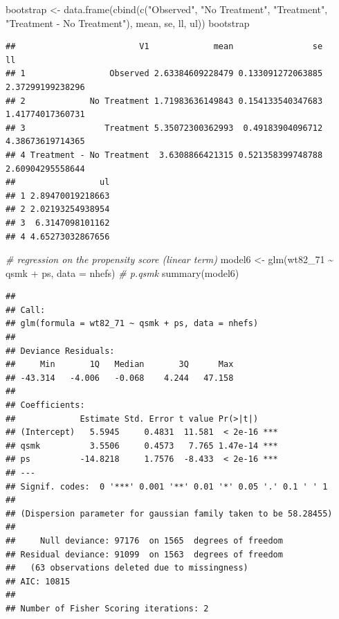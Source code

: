 \documentclass[
  10pt,
]{book}
\newenvironment{Shaded}{\begin{snugshade}}{\end{snugshade}}
\newcommand{\AttributeTok}[1]{\textcolor[rgb]{0.77,0.63,0.00}{#1}}
\newcommand{\CommentTok}[1]{\textcolor[rgb]{0.56,0.35,0.01}{\textit{#1}}}
\newcommand{\FunctionTok}[1]{\textcolor[rgb]{0.00,0.00,0.00}{#1}}
\newcommand{\NormalTok}[1]{#1}
\newcommand{\OtherTok}[1]{\textcolor[rgb]{0.56,0.35,0.01}{#1}}
\newcommand{\SpecialCharTok}[1]{\textcolor[rgb]{0.00,0.00,0.00}{#1}}
\newcommand{\StringTok}[1]{\textcolor[rgb]{0.31,0.60,0.02}{#1}}
\begin{document}
\begin{Shaded}
\begin{Highlighting}[]
\NormalTok{bootstrap }\OtherTok{\textless{}{-}} \FunctionTok{data.frame}\NormalTok{(}\FunctionTok{cbind}\NormalTok{(}\FunctionTok{c}\NormalTok{(}\StringTok{"Observed"}\NormalTok{, }\StringTok{"No Treatment"}\NormalTok{, }\StringTok{"Treatment"}\NormalTok{, }
                                \StringTok{"Treatment {-} No Treatment"}\NormalTok{), mean, se, ll, ul))}
\NormalTok{bootstrap}
\end{Highlighting}
\end{Shaded}

\begin{verbatim}
##                         V1             mean                se               ll
## 1                 Observed 2.63384609228479 0.133091272063885 2.37299199238296
## 2             No Treatment 1.71983636149843 0.154133540347683 1.41774017360731
## 3                Treatment 5.35072300362993  0.49183904096712 4.38673619714365
## 4 Treatment - No Treatment  3.6308866421315 0.521358399748788 2.60904295558644
##                 ul
## 1 2.89470019218663
## 2 2.02193254938954
## 3  6.3147098101162
## 4 4.65273032867656
\end{verbatim}

\begin{Shaded}
\begin{Highlighting}[]
\CommentTok{\# regression on the propensity score (linear term)}
\NormalTok{model6 }\OtherTok{\textless{}{-}} \FunctionTok{glm}\NormalTok{(wt82\_71 }\SpecialCharTok{\textasciitilde{}}\NormalTok{ qsmk }\SpecialCharTok{+}\NormalTok{ ps, }\AttributeTok{data =}\NormalTok{ nhefs) }\CommentTok{\# p.qsmk}
\FunctionTok{summary}\NormalTok{(model6)}
\end{Highlighting}
\end{Shaded}

\begin{verbatim}
## 
## Call:
## glm(formula = wt82_71 ~ qsmk + ps, data = nhefs)
## 
## Deviance Residuals: 
##     Min       1Q   Median       3Q      Max  
## -43.314   -4.006   -0.068    4.244   47.158  
## 
## Coefficients:
##             Estimate Std. Error t value Pr(>|t|)    
## (Intercept)   5.5945     0.4831  11.581  < 2e-16 ***
## qsmk          3.5506     0.4573   7.765 1.47e-14 ***
## ps          -14.8218     1.7576  -8.433  < 2e-16 ***
## ---
## Signif. codes:  0 '***' 0.001 '**' 0.01 '*' 0.05 '.' 0.1 ' ' 1
## 
## (Dispersion parameter for gaussian family taken to be 58.28455)
## 
##     Null deviance: 97176  on 1565  degrees of freedom
## Residual deviance: 91099  on 1563  degrees of freedom
##   (63 observations deleted due to missingness)
## AIC: 10815
## 
## Number of Fisher Scoring iterations: 2
\end{verbatim}
\end{document}
